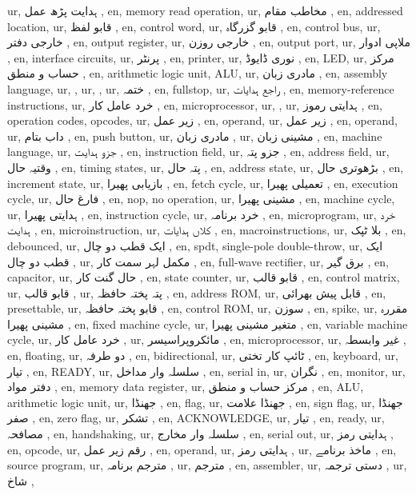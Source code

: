 ur, ہدایت پڑھ عمل  ,
en, memory read operation,
ur, مخاطب مقام  ,
en, addressed location,
ur,  قابو لفظ  ,
en, control word,
ur,  قابو گزرگاہ  ,
en, control bus,
ur,  خارجی دفتر  ,
en, output register,
ur,  خارجی روزن  ,
en, output port,
ur,  ملاپی ادوار  ,
en, interface circuits,
ur,  پرنٹر ,
en, printer,
ur,  نوری ڈایوڈ  ,
en, LED,
ur,  مرکز حساب و منطق  ,
en, arithmetic logic unit, ALU,
ur,  مادری زبان  ,
en,  assembly language,
ur,  ,
ur,  ,
ur,  ختمہ  ,
en, fullstop,
ur,  راجع ہدایات  ,
en, memory-reference instructions,
ur,  خرد عامل کار  ,
en, microprocessor,
ur,   ,
ur, ہدایتی رموز  ,
en, operation codes, opcodes,
ur,  زیر عمل  ,
en, operand,
ur, زیر عمل  ,
en, operand,
ur,  داب بتام  ,
en, push button,
ur,  مادری زبان  ,
ur, مشینی زبان ,
en, machine language,
ur,  جزو ہدایت  ,
en, instruction field,
ur, جزو پتہ  ,
en, address field,
ur,  وقتیہ حال  ,
en, timing states,
ur, پتہ حال ,
en, address state,
ur,  بڑھوتری حال ,
en, increment state,
ur,  بازیابی پھیرا  ,
en, fetch cycle,
ur,  تعمیلی پھیرا  ,
en, execution cycle,
ur,  فارغ حال  ,
en, nop, no operation,
ur,  مشینی پھیرا  ,
en, machine cycle,
ur,  ہدایتی پھیرا  ,
en, instruction cycle,
ur,  خرد برنامہ  ,
en, microprogram,
ur,  خرد ہدایت  ,
en, microinstruction,
ur,  کلاں ہدایات  ,
en, macroinstructions,
ur,  بلا ٹپک  ,
en, debounced,
ur,  ایک قطب دو چال  ,
en, spdt, single-pole double-throw,
ur,  ایک قطب دو چال  ,
ur, مکمل لہر سمت کار  ,
en, full-wave rectifier,
ur,  برق گیر  ,
en, capacitor,
ur,  حال گنت کار  ,
en, state counter,
ur,  قابو قالب ,
en, control matrix,
ur,  قابو قالب  ,
ur, پتہ پختہ حافظہ ,
en, address ROM,
ur, قابل پیش بھرائی ,
en, presettable,
ur,  قابو پختہ حافظہ  ,
en, control ROM,
ur,  سوزن  ,
en, spike,
ur, مقررہ مشینی پھیرا  ,
en, fixed machine cycle,
ur,  متغیر مشینی پھیرا  ,
en, variable machine cycle,
ur,  خرد عامل کار  ,
ur, مائکروپراسیسر ,
en, microprocessor,
ur,  غیر وابسطہ  ,
en, floating,
ur,  دو طرفہ  ,
en, bidirectional,
ur, ٹائپ کار تختی  ,
en, keyboard,
ur, تیار ,
en, READY,
ur, سلسلہ وار مداخل ,
en, serial in,
ur,  نگران  ,
en, monitor,
ur,  دفتر مواد  ,
en, memory data register,
ur,  مرکز حساب و منطق  ,
en, ALU, arithmetic logic unit,
ur, جھنڈا  ,
en, flag,
ur,  جھنڈا علامت  ,
en, sign flag,
ur,  جھنڈا صفر  ,
en, zero flag,
ur,  تشکر  ,
en, ACKNOWLEDGE,
ur, تیار  ,
en, ready,
ur,  مصافحہ  ,
en, handshaking,
ur,  سلسلہ وار مخارج ,
en, serial out,
ur,  ہدایتی رمز  ,
en, opcode,
ur, رقم زیر عمل  ,
en, operand,
ur, ہدایتی رمز  ,
ur, ماخذ برنامے ,
en, source program,
ur, مترجم برنامہ  ,
ur, مترجم  ,
en, assembler,
ur,  دستی ترجمہ ,
ur, شاخ  ,
